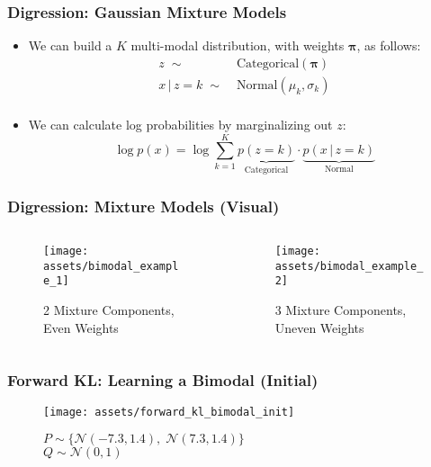 \documentclass{beamer}
\begin{document}
\begin{frame}
  \frametitle{Digression: Gaussian Mixture Models}
  \begin{itemize}
    \item We can build a $K$ multi-modal distribution, with weights
      $\mathbf{\pi}$, as follows:
    \begin{equation*}
      \begin{aligned}
      z \; \sim& \; \text{Categorical}(\mathbf{\pi}) \\
      x \,|\, z = k \; \sim& \; \text{Normal}(\mu_k, \sigma_k) \\
    \end{aligned}
    \end{equation*}
    \item We can calculate log probabilities by marginalizing out $z$:
    \begin{equation*}
      \log p(x) = \log \sum_{k=1}^{K} \underbrace{p(z = k)}_{\text{Categorical}} \cdot \underbrace{p(x \,|\, z=k)}_{\text{Normal}}
    \end{equation*}
  \end{itemize}
\end{frame}

\begin{frame}
  \frametitle{Digression: Mixture Models (Visual)}
  \begin{columns}
    \centering
    \begin{column}{0.48\textwidth}
      \begin{figure}
        \centering
        \texttt{[image: assets/bimodal\_example\_1]}
        \caption{2 Mixture Components, Even Weights}
      \end{figure}
    \end{column}
    \begin{column}{0.48\textwidth}
      \begin{figure}
        \centering
        \texttt{[image: assets/bimodal\_example\_2]}
        \caption{3 Mixture Components, Uneven Weights}
      \end{figure}
    \end{column}
  \end{columns}
\end{frame}


\begin{frame}
  \frametitle{Forward KL: Learning a Bimodal (Initial)}
  \begin{figure}
    \centering
    \texttt{[image: assets/forward\_kl\_bimodal\_init]}
    \caption{$P \sim \big\{\mathcal{N}(-7.3, 1.4), \; \mathcal{N}(7.3, 1.4) \big\}$\\$Q \sim \mathcal{N}(0, 1)$}
  \end{figure}
\end{frame}
\end{document}
